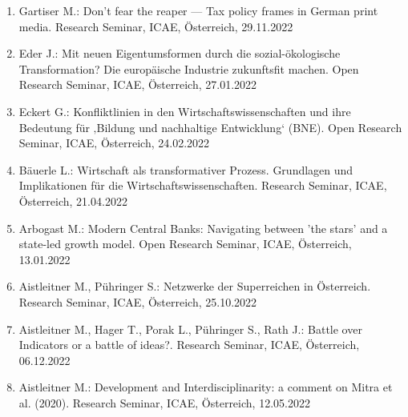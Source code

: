 \begin{enumerate}
	\item Gartiser M.: Don’t fear the reaper — Tax policy frames in German print media. Research Seminar, ICAE, Österreich, 29.11.2022
	\item Eder J.: Mit neuen Eigentumsformen durch die sozial-ökologische Transformation? Die europäische Industrie zukunftsfit machen. Open Research Seminar, ICAE, Österreich, 27.01.2022
	\item Eckert G.: Konfliktlinien in den Wirtschaftswissenschaften und ihre Bedeutung für ‚Bildung und nachhaltige Entwicklung‘ (BNE). Open Research Seminar, ICAE, Österreich, 24.02.2022
	\item Bäuerle L.: Wirtschaft als transformativer Prozess. Grundlagen und Implikationen für die Wirtschaftswissenschaften. Research Seminar, ICAE, Österreich, 21.04.2022
	\item Arbogast M.: Modern Central Banks: Navigating between 'the stars' and a state-led growth model. Open Research Seminar, ICAE, Österreich, 13.01.2022
	\item Aistleitner M., Pühringer S.: Netzwerke der Superreichen in Österreich. Research Seminar, ICAE, Österreich, 25.10.2022
	\item Aistleitner M., Hager T., Porak L., Pühringer S., Rath J.: Battle over Indicators or a battle of ideas?. Research Seminar, ICAE, Österreich, 06.12.2022
	\item Aistleitner M.: Development and Interdisciplinarity: a comment on Mitra et al. (2020). Research Seminar, ICAE, Österreich, 12.05.2022
\end{enumerate}
